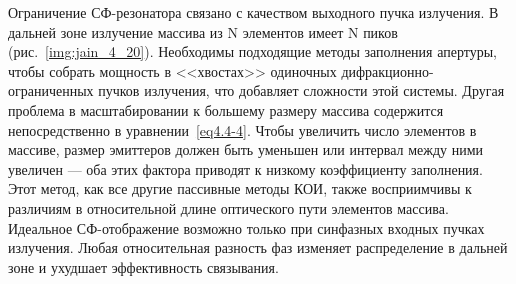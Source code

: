 Ограничение СФ-резонатора связано с качеством выходного пучка излучения. В дальней зоне излучение массива из N элементов имеет N пиков (рис.~\ref{img:jain_4_20}). Необходимы подходящие методы заполнения апертуры, чтобы собрать мощность в <<хвостах>> одиночных дифракционно-ограниченных пучков излучения, что добавляет сложности этой системы. Другая проблема в масштабировании к большему размеру массива содержится непосредственно в уравнении~\eqref{eq4.4-4}. Чтобы увеличить число элементов в массиве, размер эмиттеров должен быть уменьшен или интервал между ними увеличен --- оба этих фактора приводят к низкому коэффициенту заполнения. Этот метод, как все другие пассивные методы КОИ, также восприимчивы к различиям в относительной длине оптического пути элементов массива. Идеальное СФ-отображение возможно только при синфазных входных пучках излучения. Любая относительная разность фаз изменяет распределение в дальней зоне и ухудшает эффективность связывания.



